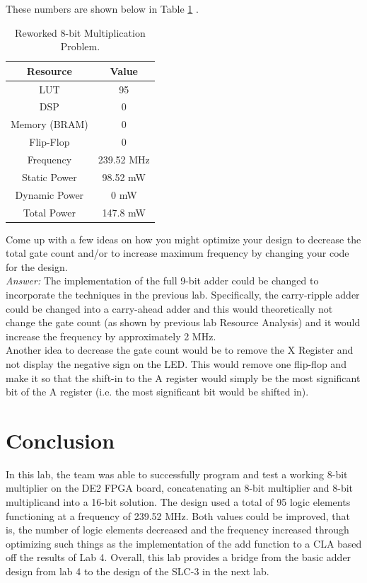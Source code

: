 \documentclass[journal, twocolumn, final,11pt,letterpaper]{IEEEtran}
\begin{document}
These numbers are shown below in Table \ref{tab:table2} .

\begin{table}[htbp]
	\centering
	\caption{Reworked 8-bit Multiplication Problem. }
	\begin{tabular}{c|c}	%
		\toprule	%
		Resource & Value \\
		\midrule
		LUT & 95\\
		DSP & 0\\
		Memory (BRAM) & 0\\
		Flip-Flop & 0\\
		Frequency & 239.52 MHz\\
		Static Power & 98.52 mW\\
		Dynamic Power & 0 mW\\
		Total Power & 147.8 mW\\
		\bottomrule	%
	\end{tabular}%
	\label{tab:table2}	%
\end{table}%
 
Come up with a few ideas on how you might optimize your design to decrease the total gate count and/or to increase maximum frequency by changing your code for the design.\\

\textit{Answer:} The implementation of the full 9-bit adder could be changed to incorporate the techniques in the previous lab. Specifically, the carry-ripple adder could be changed into a carry-ahead adder and this would theoretically not change the gate count (as shown by previous lab Resource Analysis) and it would increase the frequency by approximately 2 MHz. \\

Another idea to decrease the gate count would be to remove the X Register and not display the negative sign on the LED. This would remove one flip-flop and make it so that the shift-in to the A register would simply be the most significant bit of the A register (i.e. the most significant bit would be shifted in).

\section{Conclusion}
In this lab, the team was able to successfully program and test a working 8-bit multiplier on the DE2 FPGA board, concatenating an 8-bit multiplier and 8-bit multiplicand into a 16-bit solution.  The design used a total of 95 logic elements functioning at a frequency of 239.52 MHz.  Both values could be improved, that is, the number of logic elements decreased and the frequency increased through optimizing such things as the implementation of the add function to a CLA based off the results of Lab 4.  Overall, this lab provides a bridge from the basic adder design from lab 4 to the design of the SLC-3 in the next lab.    
\end{document}
